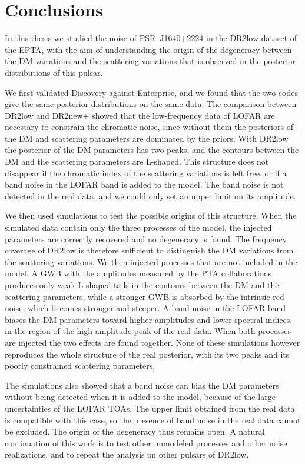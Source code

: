 \chapter*{Conclusions}
\label{Conclusions}

In this thesis we studied the noise of PSR~J1640+2224 in the DR2low
dataset of the EPTA, with the aim of understanding the origin of the
degeneracy between the DM variations and the scattering variations that
is observed in the posterior distributions of this pulsar.

We first validated Discovery against Enterprise, and we found that the two
codes give the same posterior distributions on the same data. The
comparison between DR2low and DR2new+ showed that the low-frequency data
of LOFAR are necessary to constrain the chromatic noise, since without
them the posteriors of the DM and scattering parameters are dominated by
the priors. With DR2low the posterior of the DM parameters has two peaks,
and the contours between the DM and the scattering parameters are
L-shaped. This structure does not disappear if the chromatic index of the
scattering variations is left free, or if a band noise in the LOFAR band
is added to the model. The band noise is not detected in the real data,
and we could only set an upper limit on its amplitude.

We then used simulations to test the possible origins of this structure.
When the simulated data contain only the three processes of the model, the
injected parameters are correctly recovered and no degeneracy is found.
The frequency coverage of DR2low is therefore sufficient to distinguish
the DM variations from the scattering variations. We then injected
processes that are not included in the model. A GWB with the amplitudes
measured by the PTA collaborations produces only weak L-shaped tails in
the contours between the DM and the scattering parameters, while a
stronger GWB is absorbed by the intrinsic red noise, which becomes
stronger and steeper. A band noise in the LOFAR band biases the DM
parameters toward higher amplitudes and lower spectral indices, in the
region of the high-amplitude peak of the real data. When both processes
are injected the two effects are found together. None of these
simulations however reproduces the whole structure of the real posterior,
with its two peaks and its poorly constrained scattering parameters.

The simulations also showed that a band noise can bias the DM parameters
without being detected when it is added to the model, because of the
large uncertainties of the LOFAR TOAs. The upper limit obtained from the
real data is compatible with this case, so the presence of band noise in
the real data cannot be excluded. The origin of the degeneracy thus
remains open. A natural continuation of this work is to test other
unmodeled processes and other noise realizations, and to repeat the
analysis on other pulsars of DR2low.

